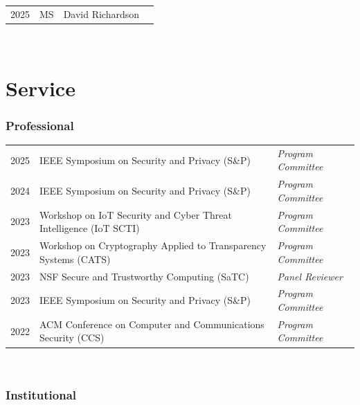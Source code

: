 \documentclass[10pt,singlecolumn]{article} %
\begin{document}
\begin{tabular}{rlll}
2025 & MS & David Richardson & \\ 
\end{tabular}\\



\section{Service}

\subsubsection*{Professional}

\begin{tabular}{rll}
2025 & IEEE Symposium on Security and Privacy (S\&P) & \emph{Program Committee} \\ 
2024 & IEEE Symposium on Security and Privacy (S\&P) & \emph{Program Committee} \\ 
2023 & Workshop on IoT Security and Cyber Threat Intelligence (IoT SCTI) & \emph{Program Committee} \\
2023 & Workshop on Cryptography Applied to Transparency Systems (CATS) & \emph{Program Committee} \\ 
2023 & NSF Secure and Trustworthy Computing (SaTC) & \emph{Panel Reviewer} \\
2023 & IEEE Symposium on Security and Privacy (S\&P) & \emph{Program Committee} \\ 
2022 & ACM Conference on Computer and Communications Security (CCS) & \emph{Program Committee} \\
\end{tabular} \\

\subsubsection*{Institutional}
\end{document}
